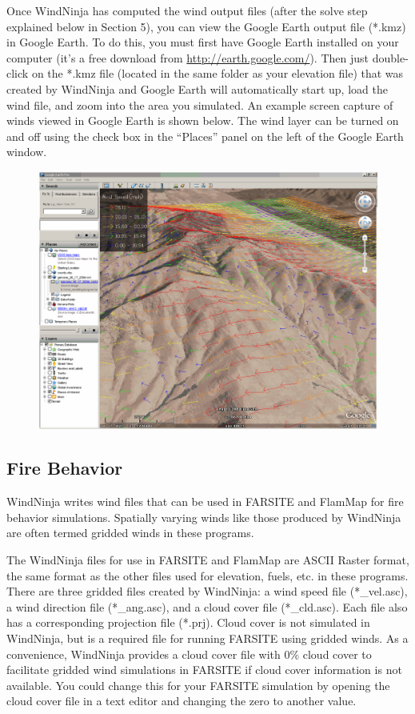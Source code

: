 \documentclass[12pt]{article}
\begin{document}
Once WindNinja has computed the wind output files (after the solve step explained below in Section 5), you can view the Google Earth output file (*.kmz) in Google Earth.  To do this, you must first have Google Earth installed on your computer (it’s a free download from \url{http://earth.google.com/}).  Then just double-click on the *.kmz file (located in the same folder as your elevation file) that was created by WindNinja and Google Earth will automatically start up, load the wind file, and zoom into the area you simulated. An example screen capture of winds viewed in Google Earth is shown below.  The wind layer can be turned on and off using the check box in the “Places” panel on the left of the Google Earth window.

\begin{figure}[H]
	\label{}
	\includegraphics[scale=0.35]{earth_1}
\end{figure}

\subsection{Fire Behavior}
WindNinja writes wind files that can be used in FARSITE and FlamMap for fire behavior simulations.  Spatially varying winds like those produced by WindNinja are often termed gridded winds in these programs.

The WindNinja files for use in FARSITE and FlamMap are ASCII Raster format, the same format as the other files used for elevation, fuels, etc. in these programs.  There are three gridded files created by WindNinja:  a wind speed file (*\_vel.asc), a wind direction file (*\_ang.asc), and a cloud cover file (*\_cld.asc).  Each file also has a corresponding projection file (*.prj).  Cloud cover is not simulated in WindNinja, but is a required file for running FARSITE using gridded winds.  As a convenience, WindNinja provides a cloud cover file with 0\% cloud cover to facilitate gridded wind simulations in FARSITE if cloud cover information is not available.  You could change this for your FARSITE simulation by opening the cloud cover file in a text editor and changing the zero to another value.
\end{document}
